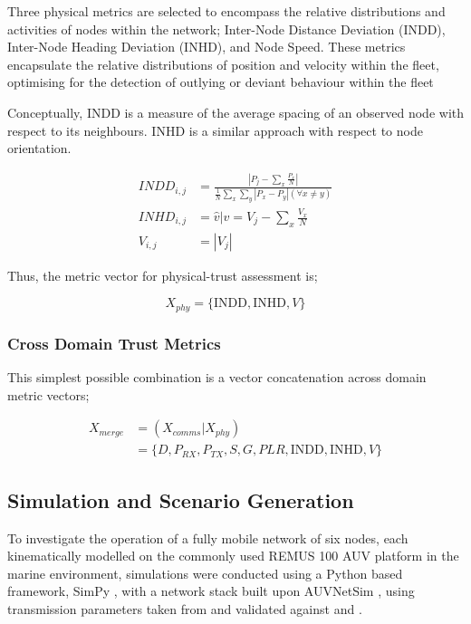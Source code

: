 \documentclass[conference]{IEEEtran}
\begin{document}
Three physical metrics are selected to encompass the relative distributions and activities of nodes within the network; Inter-Node Distance Deviation (INDD), Inter-Node Heading Deviation (INHD), and Node Speed. These metrics encapsulate the relative distributions of position and velocity within the fleet, optimising for the detection of outlying or deviant behaviour within the fleet~\cite{Bolster2016}

Conceptually, INDD is a measure of the average spacing of an observed node with respect to its neighbours. INHD is a similar approach with respect to node orientation.

\begin{align}
	INDD_{i,j} &= \frac{|P_j - \sum_x \frac{P_x}{N}|}{\frac{1}{N}\sum_x \sum_y{|P_x - P_y| (\forall x \neq y)}}\\
	INHD_{i,j} &= \hat{v} \vert v= V_j - \sum_x{\frac{V_x}{N}}\\
	V_{i,j} &= |V_j|
\end{align}

Thus, the metric vector for physical-trust assessment is;

\begin{equation}
  X_{phy}=\{\text{INDD}, \text{INHD}, V\}
	\label{eq:phys:vector}
\end{equation}

\subsubsection{Cross Domain Trust Metrics}
This simplest possible combination is a vector concatenation across domain metric vectors; 

\begin{align}
  X_{merge} &=  (X_{comms}|X_{phy}) \\
  &= \{D, P_{RX}, P_{TX}, S, G, PLR, \text{INDD}, \text{INHD}, V\}
  \label{eq:phys:vector}
\end{align}


\subsection{Simulation and Scenario Generation}
To investigate the operation of a fully mobile network of six nodes, each kinematically modelled on the commonly used REMUS 100 AUV platform \cite{Milgram2001} in the marine environment, simulations were conducted using a Python based framework, SimPy \cite{Mueller2003SimPy}, with a network stack built upon AUVNetSim \cite{Miquel2008}, using transmission parameters taken from and validated against \cite{Stojanovic2007} and \cite{Stefanov2011}.
\end{document}
